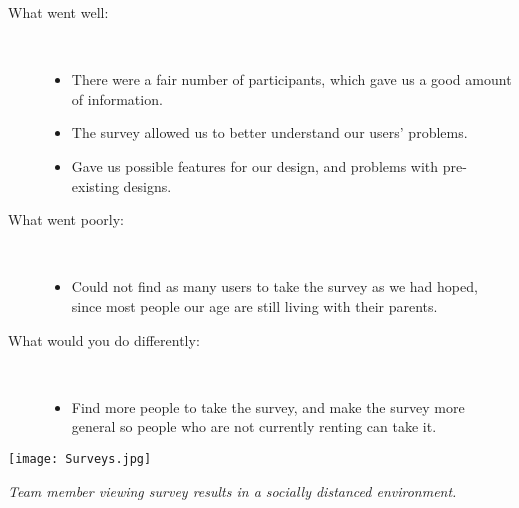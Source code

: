 \documentclass{article}
\begin{document}
\begin{description}
\begin{itemize}
        \end{itemize}
    \item [What went well:]
    \newline \,
        \begin{itemize}
            \item There were a fair number of participants, which gave us a good amount of information.
            \item The survey allowed us to better understand our users' problems.
            \item Gave us possible features for our design, and problems with pre-existing designs.
        \end{itemize}
    \item [What went poorly:]
    \newline \,
        \begin{itemize}
            \item Could not find as many users to take the survey as we had hoped, since most people our age 
            are still living with their parents.
        \end{itemize}
    \item [What would you do differently:]
    \newline \,
        \begin{itemize}
            \item Find more people to take the survey, and make the survey more general so people who are 
            not currently renting can take it.
        \end{itemize}
\end{description}
\begin{center}
    \texttt{[image: Surveys.jpg]}
\end{center}
\begin{center}
    \textit{Team member viewing survey results in a socially distanced environment.}
\end{center}
\end{document}
